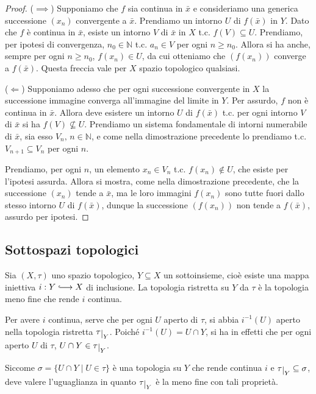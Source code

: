 \documentclass{article}
\begin{document}
\begin{proof}
	($\implies$) Supponiamo che $f$ sia continua in $\bar{x}$ e consideriamo una
	generica successione $(x_n)$ convergente a $\bar{x}$. Prendiamo un intorno
	$U$ di $f(\bar{x})$ in $Y$. Dato che $f$ è continua in $\bar{x}$, esiste un
	intorno $V$ di $\bar{x}$ in $X$ t.c. $f(V) \subseteq U$. Prendiamo, per
	ipotesi di convergenza, $n_0 \in \mathbb{N}$ t.c. $a_n \in V$ per ogni $n
	\ge n_0$. Allora si ha anche, sempre per ogni $n \ge n_0$, $f(x_n) \in U$,
	da cui otteniamo che $(f(x_n))$ converge a $f(\bar{x})$. Questa freccia vale
	per $X$ spazio topologico qualsiasi.

	($\Leftarrow$) Supponiamo adesso che per ogni successione convergente in $X$
	la successione immagine converga all'immagine del limite in $Y$. Per
	assurdo, $f$ non è continua in $\bar{x}$. Allora deve esistere un intorno
	$U$ di $f(\bar{x})$ t.c. per ogni intorno $V$ di $\bar{x}$ si ha $f(V) \not
	\subseteq U$. Prendiamo un sistema fondamentale di intorni numerabile di
	$\bar{x}$, sia esso $V_n, \, n \in \mathbb{N}$, e come nella dimostrazione
	precedente lo prendiamo t.c. $V_{n+1} \subseteq V_n$ per ogni $n$.

	Prendiamo, per ogni $n$, un elemento $x_n \in V_n$ t.c. $f(x_n) \not\in U$,
	che esiste per l'ipotesi assurda. Allora si mostra, come nella dimostrazione
	precedente, che la successione $(x_n)$ tende a $\bar{x}$, ma le loro
	immagini $f(x_n)$ sono tutte fuori dallo stesso intorno $U$ di $f(\bar{x})$,
	dunque la successione $(f(x_n))$ non tende a $f(\bar{x})$, assurdo per
	ipotesi.
\end{proof}

\subsection{Sottospazi topologici}

\begin{defn}
    Sia $(X, \tau)$ uno spazio topologico, $Y \subseteq X$ un sottoinsieme,
    cio\`e esiste una mappa iniettiva $i: Y \hooklongrightarrow X$ di
    inclusione. La topologia ristretta su $Y$ da $\tau$ \`e la topologia meno
    fine che rende $i$ continua.
\end{defn}

\begin{oss}
    Per avere $i$ continua, serve che per ogni $U$ aperto di $\tau$, si abbia
    $i^{-1}(U)$ aperto nella topologia ristretta $\tau \restrict{Y}$. Poiché
    $i^{-1}(U) = U \cap Y$, si ha in effetti che per ogni aperto $U$ di $\tau$,
    $U \cap Y \in \tau \restrict{Y}$.

    Siccome $\sigma = \{U \cap Y \;|\; U \in \tau\}$ \`e una topologia su $Y$
    che rende continua $i$ e ${\tau\restrict{Y} \subseteq \sigma}$, deve valere
    l'uguaglianza in quanto $\tau\restrict{Y}$ \`e la meno fine con tali
    proprietà.
\end{oss}
\end{document}
